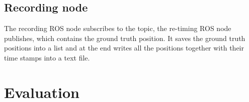 \subsection{Recording node}
\label{subsec:record_node}
The recording \ac{ROS} node subscribes to the topic, the re-timing \ac{ROS} node publishes, which contains the ground truth position. It saves the ground truth positions into a list and at the end writes all the positions together with their time stamps into a text file.

\section{Evaluation}
